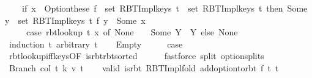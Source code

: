 \begin{isabellebody}
\ \ \ \ {\isacharparenleft}{\kern0pt}if\ x\ {\isasymin}\ Option{\isachardot}{\kern0pt}these\ {\isacharparenleft}{\kern0pt}f\ {\isacharbackquote}{\kern0pt}\ set\ {\isacharparenleft}{\kern0pt}RBT{\isacharunderscore}{\kern0pt}Impl{\isachardot}{\kern0pt}keys\ t{\isacharparenright}{\kern0pt}{\isacharparenright}{\kern0pt}\ {\isasymunion}\ set\ {\isacharparenleft}{\kern0pt}RBT{\isacharunderscore}{\kern0pt}Impl{\isachardot}{\kern0pt}keys\ t{\isacharprime}{\kern0pt}{\isacharparenright}{\kern0pt}\ then\ Some\ {\isacharparenleft}{\kern0pt}{\isacharbraceleft}{\kern0pt}y\ {\isasymin}\ set\ {\isacharparenleft}{\kern0pt}RBT{\isacharunderscore}{\kern0pt}Impl{\isachardot}{\kern0pt}keys\ t{\isacharparenright}{\kern0pt}{\isachardot}{\kern0pt}\ f\ y\ {\isacharequal}{\kern0pt}\ Some\ x{\isacharbraceright}{\kern0pt}\isanewline
\ \ \ \ {\isasymunion}\ {\isacharparenleft}{\kern0pt}case\ rbt{\isacharunderscore}{\kern0pt}lookup\ t{\isacharprime}{\kern0pt}\ x\ of\ None\ {\isasymRightarrow}\ {\isacharbraceleft}{\kern0pt}{\isacharbraceright}{\kern0pt}\ {\isacharbar}{\kern0pt}\ Some\ Y\ {\isasymRightarrow}\ Y{\isacharparenright}{\kern0pt}{\isacharparenright}{\kern0pt}\ else\ None{\isacharparenright}{\kern0pt}{\isachardoublequoteclose}\isanewline
%
\isadelimproof
%
\endisadelimproof
%
\isatagproof
{}\isamarkupfalse%
\ {\isacharparenleft}{\kern0pt}induction\ t\ arbitrary{\isacharcolon}{\kern0pt}\ t{\isacharprime}{\kern0pt}{\isacharparenright}{\kern0pt}\isanewline
\ \ \isamarkupfalse%
\ Empty\isanewline
\ \ \isamarkupfalse%
\ \isamarkupfalse%
\ {\isacharquery}{\kern0pt}case\isanewline
\ \ \ \ \isamarkupfalse%
\ rbt{\isacharunderscore}{\kern0pt}lookup{\isacharunderscore}{\kern0pt}iff{\isacharunderscore}{\kern0pt}keys{\isacharparenleft}{\kern0pt}{}{\isacharcomma}{\kern0pt}{}{\isacharparenright}{\kern0pt}{\isacharbrackleft}{\kern0pt}OF\ is{\isacharunderscore}{\kern0pt}rbt{\isacharunderscore}{\kern0pt}rbt{\isacharunderscore}{\kern0pt}sorted{\isacharbrackright}{\kern0pt}\isanewline
\ \ \ \ \isamarkupfalse%
\ {\isacharparenleft}{\kern0pt}fastforce\ split{\isacharcolon}{\kern0pt}\ option{\isachardot}{\kern0pt}splits{\isacharparenright}{\kern0pt}\isanewline
{}\isamarkupfalse%
\isanewline
\ \ \isamarkupfalse%
\ {\isacharparenleft}{\kern0pt}Branch\ col\ t{}\ k\ v\ t{}{\isacharparenright}{\kern0pt}\isanewline
\ \ \isamarkupfalse%
\ valid{\isacharcolon}{\kern0pt}\ {\isachardoublequoteopen}is{\isacharunderscore}{\kern0pt}rbt\ {\isacharparenleft}{\kern0pt}RBT{\isacharunderscore}{\kern0pt}Impl{\isachardot}{\kern0pt}fold\ {\isacharparenleft}{\kern0pt}add{\isacharunderscore}{\kern0pt}option{\isacharunderscore}{\kern0pt}to{\isacharunderscore}{\kern0pt}rbt\ f{\isacharparenright}{\kern0pt}\ t{}\ t{\isacharprime}{\kern0pt}{\isacharparenright}{\kern0pt}{\isachardoublequoteclose}\isanewline

\end{isabellebody}
